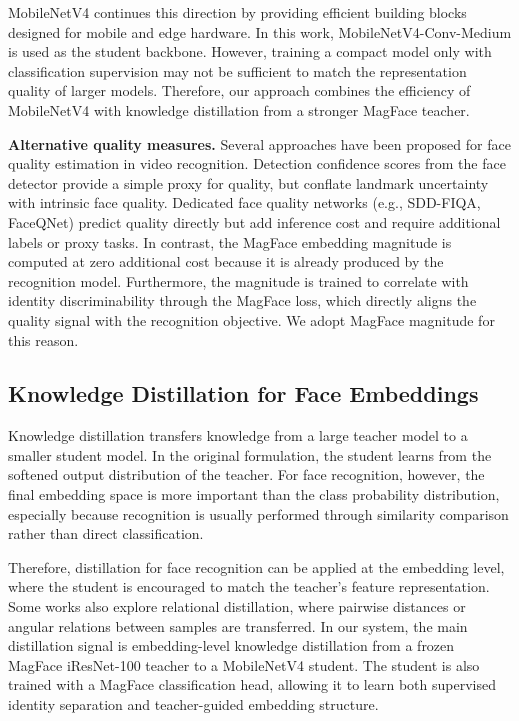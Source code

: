 MobileNetV4 continues this direction by providing efficient building blocks designed for mobile and edge hardware\cite{mobilenetv4}. In this work, MobileNetV4-Conv-Medium is used as the student backbone. However, training a compact model only with classification supervision may not be sufficient to match the representation quality of larger models. Therefore, our approach combines the efficiency of MobileNetV4 with knowledge distillation from a stronger MagFace teacher.

\textbf{Alternative quality measures.} Several approaches have been proposed for face quality estimation in video recognition. Detection confidence scores from the face detector provide a simple proxy for quality, but conflate landmark uncertainty with intrinsic face quality. Dedicated face quality networks (e.g., SDD-FIQA, FaceQNet) predict quality directly but add inference cost and require additional labels or proxy tasks. In contrast, the MagFace embedding magnitude is computed at zero additional cost because it is already produced by the recognition model. Furthermore, the magnitude is trained to correlate with identity discriminability through the MagFace loss, which directly aligns the quality signal with the recognition objective. We adopt MagFace magnitude for this reason.

\subsection{Knowledge Distillation for Face Embeddings}

Knowledge distillation transfers knowledge from a large teacher model to a smaller student model. In the original formulation, the student learns from the softened output distribution of the teacher. For face recognition, however, the final embedding space is more important than the class probability distribution, especially because recognition is usually performed through similarity comparison rather than direct classification.

Therefore, distillation for face recognition can be applied at the embedding level, where the student is encouraged to match the teacher's feature representation. Some works also explore relational distillation, where pairwise distances or angular relations between samples are transferred. In our system, the main distillation signal is embedding-level knowledge distillation from a frozen MagFace iResNet-100 teacher to a MobileNetV4 student. The student is also trained with a MagFace classification head, allowing it to learn both supervised identity separation and teacher-guided embedding structure\cite{relationalkd}\cite{magface}\cite{mobilenetv4}.

